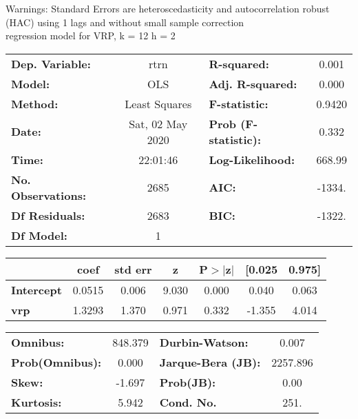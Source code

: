 Warnings: \newline
 [1] Standard Errors are heteroscedasticity and autocorrelation robust (HAC) using 1 lags and without small sample correction\\ 

regression model for VRP, k = 12 h = 2\begin{center}
\begin{tabular}{lclc}
\toprule
\textbf{Dep. Variable:}    &       rtrn       & \textbf{  R-squared:         } &     0.001   \\
\textbf{Model:}            &       OLS        & \textbf{  Adj. R-squared:    } &     0.000   \\
\textbf{Method:}           &  Least Squares   & \textbf{  F-statistic:       } &    0.9420   \\
\textbf{Date:}             & Sat, 02 May 2020 & \textbf{  Prob (F-statistic):} &    0.332    \\
\textbf{Time:}             &     22:01:46     & \textbf{  Log-Likelihood:    } &    668.99   \\
\textbf{No. Observations:} &        2685      & \textbf{  AIC:               } &    -1334.   \\
\textbf{Df Residuals:}     &        2683      & \textbf{  BIC:               } &    -1322.   \\
\textbf{Df Model:}         &           1      & \textbf{                     } &             \\
\bottomrule
\end{tabular}
\begin{tabular}{lcccccc}
                   & \textbf{coef} & \textbf{std err} & \textbf{z} & \textbf{P$> |$z$|$} & \textbf{[0.025} & \textbf{0.975]}  \\
\midrule
\textbf{Intercept} &       0.0515  &        0.006     &     9.030  &         0.000        &        0.040    &        0.063     \\
\textbf{vrp}       &       1.3293  &        1.370     &     0.971  &         0.332        &       -1.355    &        4.014     \\
\bottomrule
\end{tabular}
\begin{tabular}{lclc}
\textbf{Omnibus:}       & 848.379 & \textbf{  Durbin-Watson:     } &    0.007  \\
\textbf{Prob(Omnibus):} &   0.000 & \textbf{  Jarque-Bera (JB):  } & 2257.896  \\
\textbf{Skew:}          &  -1.697 & \textbf{  Prob(JB):          } &     0.00  \\
\textbf{Kurtosis:}      &   5.942 & \textbf{  Cond. No.          } &     251.  \\
\bottomrule
\end{tabular}
\end{center}

